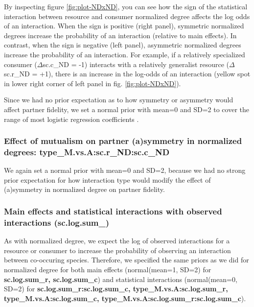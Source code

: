 \documentclass[11pt,]{article}
\begin{document}
By inspecting figure \ref{fig:plot-NDxND}, you can see how the sign of
the statistical interaction between resource and consumer normalized
degree affects the log odds of an interaction. When the sign is positive
(right panel), symmetric normalized degrees increase the probability of
an interaction (relative to main effects). In contrast, when the sign is
negative (left panel), asymmetric normalized degrees increase the
probability of an interaction. For example, if a relatively specialized
consumer (\(\Delta\)sc.c\_ND = -1) interacts with a relatively
generalist resource (\(\Delta\)sc.r\_ND = +1), there is an increase in
the log-odds of an interaction (yellow spot in lower right corner of
left panel in fig. \ref{fig:plot-NDxND}).

Since we had no prior expectation as to how symmetry or asymmetry would
affect partner fidelity, we set a normal prior with mean=0 and SD=2 to
cover the range of most logistic regression coefficients
\citep{Gelman2008}.

\subsubsection{\texorpdfstring{Effect of mutualism on partner
(a)symmetry in normalized degrees:
\textbf{type\_M.vs.A:sc.r\_ND:sc.c\_ND}}{Effect of mutualism on partner (a)symmetry in normalized degrees: type\_M.vs.A:sc.r\_ND:sc.c\_ND}}\label{effect-of-mutualism-on-partner-asymmetry-in-normalized-degrees-type_m.vs.asc.r_ndsc.c_nd}

We again set a normal prior with mean=0 and SD=2, because we had no
strong prior expectation for how interaction type would modify the
effect of (a)symmetry in normalized degree on partner fidelity.

\subsubsection{Main effects and statistical interactions with observed
interactions
(sc.log.sum\_)}\label{main-effects-and-statistical-interactions-with-observed-interactions-sc.log.sum_}

As with normalized degree, we expect the log of observed interactions
for a resource or consumer to increase the probability of observing an
interaction between co-occuring species. Therefore, we specified the
same priors as we did for normalized degree for both main effects
(normal(mean=1, SD=2) for \textbf{sc.log.sum\_r, sc.log.sum\_c}) and
statistical interactions (normal(mean=0, SD=2) for
\textbf{sc.log.sum\_r:sc.log.sum\_c, type\_M.vs.A:sc.log.sum\_r,
type\_M.vs.A:sc.log.sum\_c, type\_M.vs.A:sc.log.sum\_r:sc.log.sum\_c}).
\end{document}
